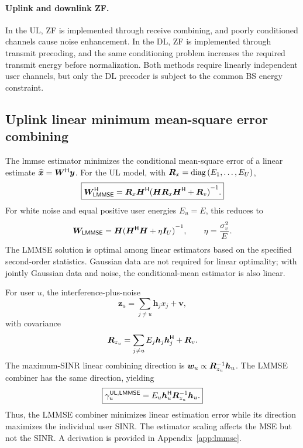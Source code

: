 \paragraph{Uplink and downlink ZF.}
In the UL, ZF is implemented through receive combining, and poorly conditioned channels cause noise enhancement. In the DL, ZF is implemented through transmit precoding, and the same conditioning problem increases the required transmit energy before normalization. Both methods require linearly independent user channels, but only the DL precoder is subject to the common BS energy constraint.

\subsection{Uplink linear minimum mean-square error combining}
The \ac{lmmse} estimator minimizes the conditional mean-square error of a linear estimate $\widehat{\bm{x}}={\bm{W}}^{\mathsf{H}}\bm{y}$. For the UL model, with $\bm{R}_x=\operatorname{diag}\left(E_1,\ldots,E_U\right)$,
\begin{equation}
	\boxed{
		{\bm{W}}^{\mathsf{H}}_{\mathsf{LMMSE}}
		=\bm{R}_x{\bm{H}}^{\mathsf{H}}
		{(\bm{H}\bm{R}_x{\bm{H}}^{\mathsf{H}}+\bm{R}_v)}^{-1}.
	}
	\label{eq:lmmse}
\end{equation}
For white noise and equal positive user energies $E_u=E$, this reduces to
\begin{equation*}
	\bm{W}_{\mathsf{LMMSE}}
	=\bm{H}{({\bm{H}}^{\mathsf{H}}\bm{H}+\eta\bm{I}_U)}^{-1},
	\qquad
	\eta=\frac{\sigma_v^2}{E}.
\end{equation*}
The LMMSE solution is optimal among linear estimators based on the specified second-order statistics. Gaussian data are not required for linear optimality; with jointly Gaussian data and noise, the conditional-mean estimator is also linear.

For user $u$, the interference-plus-noise
\[
\mathbf z_u=\sum_{j\ne u}\mathbf h_jx_j+\mathbf v,
\]
with  covariance 
\begin{equation*}
	\bm{R}_{z_u}
	=\sum_{j\ne u}E_j\bm{h}_j{\bm{h}}^{\mathsf{H}}_j+\bm{R}_v.
\end{equation*}
The maximum-SINR linear combining direction is $\bm{w}_u\propto{\bm{R}}^{-1}_{z_u}\bm{h}_u$. The LMMSE combiner has the same direction, yielding 
\begin{equation}
	\boxed{
		\gamma_u^{\mathsf{UL},\mathsf{LMMSE}}
		=E_u{\bm{h}}^{\mathsf{H}}_u{\bm{R}}^{-1}_{z_u}\bm{h}_u.
	}
	\label{eq:maxsinr}
\end{equation}
Thus, the LMMSE combiner minimizes linear estimation error while its direction maximizes the individual user SINR. The estimator scaling affects the MSE but not the SINR. A derivation is provided in Appendix~\ref{app:lmmse}.

